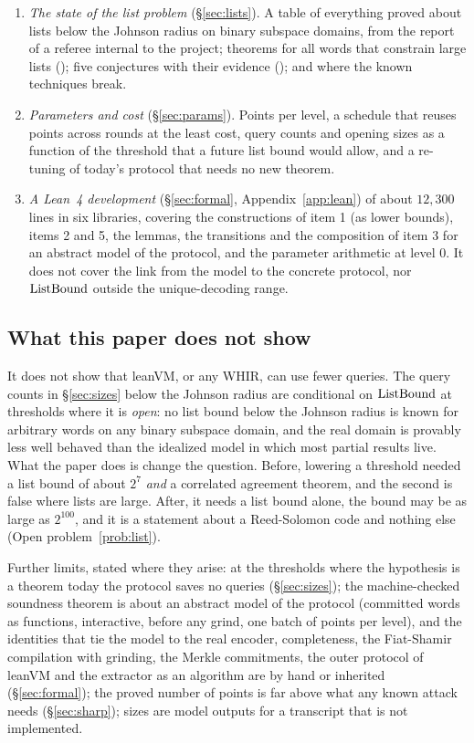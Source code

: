 \begin{enumerate}[itemsep=2pt,topsep=3pt]
\item \emph{The state of the list problem} (\S\ref{sec:lists}). A table of everything proved about lists below the Johnson radius on binary subspace domains, from the report of a referee internal to the project; theorems for all words that constrain large lists (\stpr); five conjectures with their evidence (\stcj); and where the known techniques break.
\item \emph{Parameters and cost} (\S\ref{sec:params}). Points per level, a schedule that reuses points across rounds at the least cost, query counts and opening sizes as a function of the threshold that a future list bound would allow, and a re-tuning of today's protocol that needs no new theorem.
\item \emph{A Lean~4 development} (\S\ref{sec:formal}, Appendix~\ref{app:lean}) of about $12{,}300$ lines in six libraries, covering the constructions of item 1 (as lower bounds), items 2 and 5, the lemmas, the transitions and the composition of item 3 for an abstract model of the protocol, and the parameter arithmetic at level $0$. It does not cover the link from the model to the concrete protocol, nor $\mathrm{ListBound}$ outside the unique-decoding range.
\end{enumerate}

\subsection{What this paper does not show}

It does not show that leanVM, or any WHIR, can use fewer queries. The query counts in \S\ref{sec:sizes} below the Johnson radius are conditional on $\mathrm{ListBound}$ at thresholds where it is \emph{open}: no list bound below the Johnson radius is known for arbitrary words on any binary subspace domain, and the real domain is provably less well behaved than the idealized model in which most partial results live. What the paper does is change the question. Before, lowering a threshold needed a list bound of about $2^7$ \emph{and} a correlated agreement theorem, and the second is false where lists are large. After, it needs a list bound alone, the bound may be as large as $2^{100}$, and it is a statement about a Reed-Solomon code and nothing else (Open problem~\ref{prob:list}).

Further limits, stated where they arise: at the thresholds where the hypothesis is a theorem today the protocol saves no queries (\S\ref{sec:sizes}); the machine-checked soundness theorem is about an abstract model of the protocol (committed words as functions, interactive, before any grind, one batch of points per level), and the identities that tie the model to the real encoder, completeness, the Fiat-Shamir compilation with grinding, the Merkle commitments, the outer protocol of leanVM and the extractor as an algorithm are by hand or inherited (\S\ref{sec:formal}); the proved number of points is far above what any known attack needs (\S\ref{sec:sharp}); sizes are model outputs for a transcript that is not implemented.

